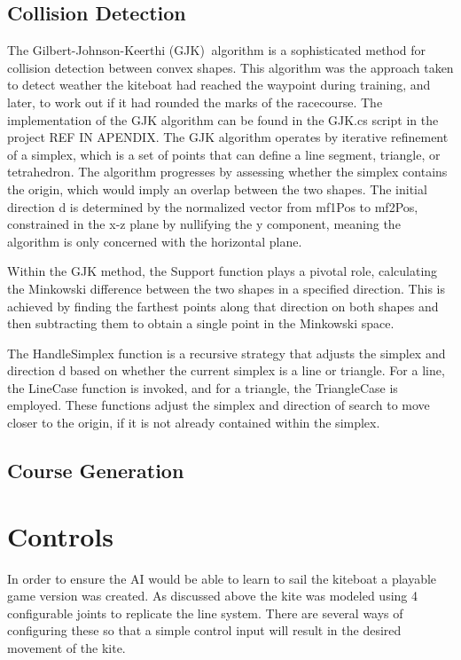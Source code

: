 \subsection{Collision Detection}
The Gilbert-Johnson-Keerthi (GJK)$~$\cite{gilbert88gjk} algorithm is a sophisticated method for collision detection between convex shapes. This algorithm was the approach taken to detect weather the kiteboat had reached the waypoint during training, and later, to work out if it had rounded the marks of the racecourse. The implementation of the GJK algorithm can be found in the GJK.cs script in the project REF IN APENDIX.
The GJK algorithm operates by iterative refinement of a simplex, which is a set of points that can define a line segment, triangle, or tetrahedron. The algorithm progresses by assessing whether the simplex contains the origin, which would imply an overlap between the two shapes. The initial direction d is determined by the normalized vector from mf1Pos to mf2Pos, constrained in the x-z plane by nullifying the y component, meaning the algorithm is only concerned with the horizontal plane.  

Within the GJK method, the Support function plays a pivotal role, calculating the Minkowski difference between the two shapes in a specified direction. This is achieved by finding the farthest points along that direction on both shapes and then subtracting them to obtain a single point in the Minkowski space.

The HandleSimplex function is a recursive strategy that adjusts the simplex and direction d based on whether the current simplex is a line or triangle. For a line, the LineCase function is invoked, and for a triangle, the TriangleCase is employed. These functions adjust the simplex and direction of search to move closer to the origin, if it is not already contained within the simplex.

\subsection{Course Generation}


\section{Controls}
In order to ensure the AI would be able to learn to sail the kiteboat a playable game version was created. As discussed above the kite was modeled using 4 configurable joints to replicate the line system. There are several ways of configuring these so that a simple control input will result in the desired movement of the kite. 



